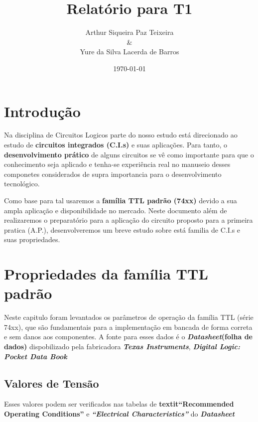 \documentclass[11pt]{report}         %
\title{Relatório para T1}
\author{Arthur Siqueira Paz Teixeira \\ \& \\ Yure da Silva Lacerda de Barros}
\affil{Disciplina: Circuitos Lógicos -- Professor: Fabio Marujo}
\date{\today}
\begin{document}

\maketitle                        %
\tableofcontents                  %

\chapter {Introdução}             %

Na disciplina de Circuitos Logicos parte do nosso estudo está direcionado ao estudo de \textbf{circuitos integrados (C.I.s)} e suas aplicações. Para tanto, o 
\textbf{desenvolvimento prático} de alguns circuitos se vê como importante para que o conhecimento seja aplicado e tenha-se experiência real no manuseio desses 
componetes considerados de supra importancia para o desenvolvimento tecnológico.

Como base para tal usaremos a \textbf{família TTL padrão (74xx)} devido a sua ampla aplicação e disponibilidade no mercado. Neste documento além de realizaremos 
o preparatório para a aplicação do circuito proposto para a primeira pratica (A.P.), desenvolveremos um breve estudo sobre está familia de C.I.s e suas 
propriedades.

\chapter {Propriedades da família TTL padrão}

Neste capitulo foram levantados os parâmetros de operação da família TTL (série 74xx), que são fundamentais para a implementação em bancada de forma correta e sem danos 
aos componentes. A fonte para esses dados é o \textbf{\textit{Datasheet}(folha de dados)} dispobilizado pela fabricadora \textbf{\textit{Texas Instruments}}, 
\textbf{\textit{Digital Logic: Pocket Data Book}}

\section{Valores de Tensão}

  Esses valores podem ser verificados nas tabelas de \textbf{textit{``Recommended Operating Conditions''}} e \textbf{\textit{``Electrical Characteristics''}} do 
  \textbf{\textit{Datasheet}}
\end{document}
